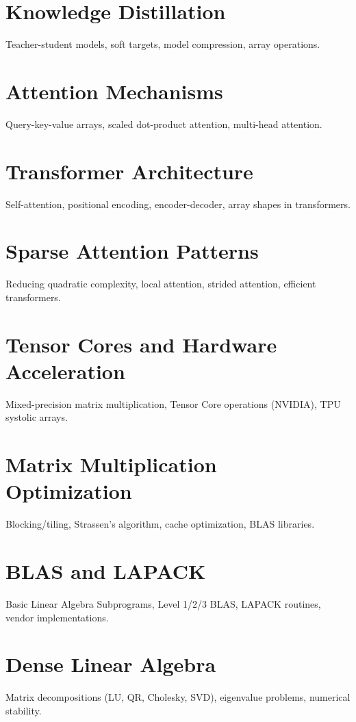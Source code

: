 \chapter{Knowledge Distillation}
Teacher-student models, soft targets, model compression, array operations.

\chapter{Attention Mechanisms}
Query-key-value arrays, scaled dot-product attention, multi-head attention.

\chapter{Transformer Architecture}
Self-attention, positional encoding, encoder-decoder, array shapes in transformers.

\chapter{Sparse Attention Patterns}
Reducing quadratic complexity, local attention, strided attention, efficient transformers.

\chapter{Tensor Cores and Hardware Acceleration}
Mixed-precision matrix multiplication, Tensor Core operations (NVIDIA), TPU systolic arrays.


\chapter{Matrix Multiplication Optimization}
Blocking/tiling, Strassen's algorithm, cache optimization, BLAS libraries.

\chapter{BLAS and LAPACK}
Basic Linear Algebra Subprograms, Level 1/2/3 BLAS, LAPACK routines, vendor implementations.

\chapter{Dense Linear Algebra}
Matrix decompositions (LU, QR, Cholesky, SVD), eigenvalue problems, numerical stability.

